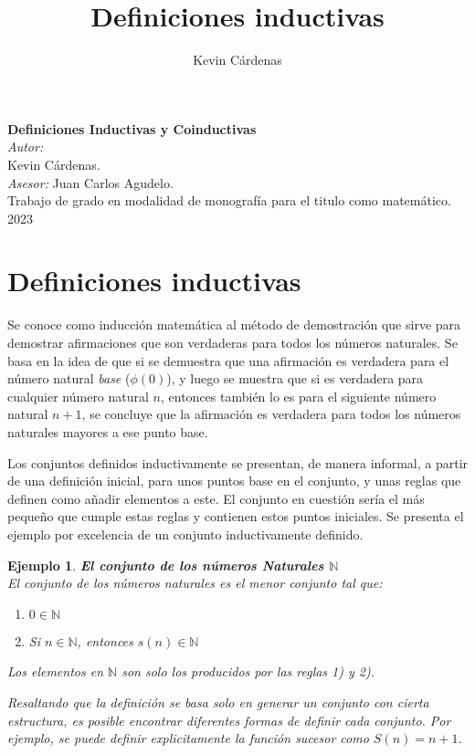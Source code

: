 \documentclass[executivepaper]{article}
\title{Definiciones inductivas}
\author{Kevin Cárdenas}
\newtheorem{ejemplo}[propo]{Ejemplo}
\newcommand{\N}{\mathbb{N}}
\begin{document}
\begin{titlepage}
    \begin{center}
        {\Huge \textbf{Definiciones Inductivas y Coinductivas}}
        \\[8cm]
        
        \large\emph{Autor:}\\
        Kevin Cárdenas.
        \\[6cm]
        \large\emph{Asesor:}
        Juan Carlos Agudelo.\\
        Trabajo de grado en modalidad de monografía para el titulo como matemático.\\
        2023
    \end{center}
\end{titlepage}

\newpage
\tableofcontents
\newpage

\section{Definiciones inductivas}

Se conoce como inducción matemática al método de demostración que sirve para demostrar afirmaciones que son verdaderas para todos los números naturales. Se basa en la idea de que si se demuestra que una afirmación es verdadera para el número natural \emph{base} ($\phi(0)$), y luego se muestra que si es verdadera para cualquier número natural $n$, entonces también lo es para el siguiente número natural $n+1$, se concluye que la afirmación es verdadera para todos los números naturales mayores a ese punto base.

Los conjuntos definidos inductivamente se presentan, de manera informal, a partir de una definición inicial, para unos puntos base en el conjunto, y unas reglas que definen como añadir elementos a este. El conjunto en cuestión sería el más pequeño que cumple estas reglas y contienen estos puntos iniciales. Se presenta el ejemplo por excelencia de un conjunto inductivamente definido.
\begin{ejemplo} \textbf{El conjunto de los números Naturales $\N$}\\
El conjunto de los números naturales es el \emph{menor conjunto} tal que:
\begin{enumerate}
    \item $0 \in \N$
    \item Si $n \in \N$, entonces $s(n )\in \N$
\end{enumerate}
Los elementos en $\N$ son solo los producidos por las reglas 1) y 2).

Resaltando que la definición se basa solo en generar un conjunto con cierta estructura, es posible encontrar diferentes formas de definir cada conjunto. Por ejemplo, se puede definir explicitamente la función sucesor como $S(n) = n + 1$.
\end{ejemplo}
\end{document}
